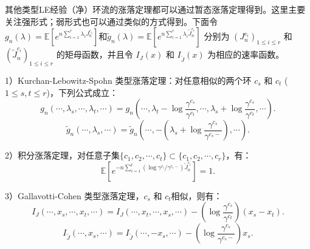 其他类型LE经验（净）环流的涨落定理都可以通过暂态涨落定理得到。这里主要关注强形式；弱形式也可以通过类似的方式得到。下面令$g_n(\lambda) = \mathbb{E}[e^{n\sum_{i=1}^r\lambda_i J^{c_i}_n}]$和$\tilde{g}_n(\lambda) = \mathbb{E}[e^{n\sum_{i=1}^{r}\lambda_i\tilde{J}^{c_i}_n}]$ 分别为 $(J^{c_i}_n)_{1\le i\le r}$ 和 $(\tilde{J}^{c_i}_n)_{1\le i\le r}$ 的矩母函数，并且令 $I_{J}(x)$ 和 $I_{\tilde{J}}(x)$ 为相应的速率函数。

1）Kurchan-Lebowitz-Spohn 类型涨落定理：对任意相似的两个环 $c_s$ 和 $c_t$ ($1\le s,t\le r$)，下列公式成立：
\begin{equation*}
	g_n(\cdots,\lambda_s,\cdots,\lambda_t,\cdots) = g_n\left(\cdots,\lambda_t-\log\frac{\gamma^{c_s}}{\gamma^{c_t}},\cdots,\lambda_s+\log\frac{\gamma^{c_s}}{\gamma^{c_t}},\cdots\right).
\end{equation*}
\begin{equation*}
	\tilde{g}_n(\cdots,\lambda_s,\cdots)=\tilde{g}_n\left(\cdots,-\left(\lambda_s+\log\frac{\gamma^{c_s}}{\gamma^{c_s-}}\right),\cdots\right).
\end{equation*}

2）积分涨落定理，对任意子集$\{c_1,c_2,\cdots, c_t\} \subset \{c_1,c_2,\cdots, c_r\}$，有： 
\begin{equation*}
	\mathbb{E}\left[e^{-n\sum_{i=1}^t(\log \gamma^{c_i}/\gamma^{c_i-})\tilde{J}^{c_i}_n}\right]=1.
\end{equation*}

3）Gallavotti-Cohen 类型涨落定理，$c_s$ 和 $c_t$相似，则有：
\begin{equation*}
	I_J(\cdots,x_s,\cdots,x_t,\cdots)=I_J(\cdots,x_t,\cdots,x_s,\cdots)-\left(\log\frac{\gamma^{c_s}}{\gamma^{c_t}}\right)(x_s-x_t).
\end{equation*}
\begin{equation*}
	I_{\tilde{J}}(\cdots,x_s,\cdots) = I_{\tilde{J}}(\cdots,-x_s,\cdots)-\left(\log\frac{\gamma^{c_s}}{\gamma^{c_s-}}\right)x_s.
\end{equation*}

